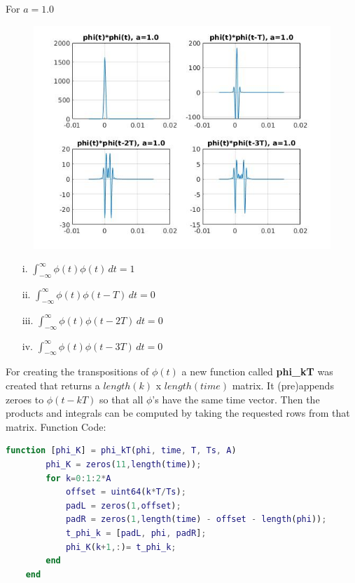 \documentclass[12pt, a4paper]{article}
\begin{document}
\begin{enumerate}
\pagebreak
For $a=1.0$
\begin{figure}[H]
\centering
\noindent\includegraphics[width=\textwidth]{phi_k_a3.jpg}
\end{figure}
\begin{enumerate}
\item[i.] $\int_{-\infty}^{\infty} \phi(t)\phi(t) \,dt = 1$
\item[ii.] $\int_{-\infty}^{\infty} \phi(t)\phi(t-T) \,dt = 0$
\item[iii.] $\int_{-\infty}^{\infty} \phi(t)\phi(t-2T) \,dt = 0$
\item[iv.] $\int_{-\infty}^{\infty} \phi(t)\phi(t-3T) \,dt = 0$
\end{enumerate}
\end{enumerate}

\pagebreak
For creating the transpositions of $\phi(t)$ a new function called \textbf{phi\_kT} was created that returns a $length(k)$ x $length(time)$ matrix. 
It (pre)appends zeroes to $\phi(t-kT)$ so that all $\phi$'s have the same
time vector. Then the products and integrals can be computed by taking the requested rows from that matrix.
Function Code:
\begin{lstlisting}[language=MATLAB]
    function [phi_K] = phi_kT(phi, time, T, Ts, A)
        phi_K = zeros(11,length(time));
        for k=0:1:2*A
            offset = uint64(k*T/Ts);
            padL = zeros(1,offset);
            padR = zeros(1,length(time) - offset - length(phi));
            t_phi_k = [padL, phi, padR];
            phi_K(k+1,:)= t_phi_k;
        end
    end
\end{lstlisting}
\end{document}
